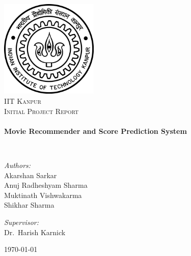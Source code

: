\begin{titlepage}
\begin{center}

\includegraphics[width=0.35\textwidth]{./logo.jpg}~\\[1cm]

\textsc{\LARGE IIT Kanpur}\\[1.5cm]

\textsc{\Large Initial Project Report}\\[0.5cm]

\HRule \\[0.4cm]
{ \huge \bfseries Movie Recommender and Score Prediction System \\[0.4cm] }

\HRule \\[1.5cm]

\begin{minipage}{0.5\textwidth}
\begin{flushleft} \large
\emph{Authors:}\\
Akarshan Sarkar\\
Anuj Radheshyam Sharma\\
Muktinath Vishwakarma\\
Shikhar Sharma
\end{flushleft}
\end{minipage}
\begin{minipage}{0.4\textwidth}
\begin{flushright} \large
\emph{Supervisor:} \\
Dr.~Harish Karnick
\end{flushright}
\end{minipage}

\vfill

{\large \today}

\end{center}
\end{titlepage}